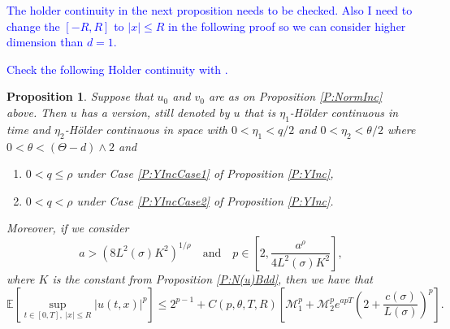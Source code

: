 \documentclass[a4paper,11pt]{article}
\numberwithin{equation}{section}
\theoremstyle{plain}
\newtheorem{proposition}[theorem]{Proposition}
\theoremstyle{definition}
\numberwithin{NQ}{section}
\numberwithin{LQ}{section}
\numberwithin{ZQ}{section}
\begin{document}
	\textcolor{blue}{The holder continuity in the next proposition needs to be checked. Also I need to change the $[-R,R]$ to $|x| \le R$ in the following proof so we can consider higher dimension than $d=1$.}
	
	\textcolor{blue}{Check the following Holder continuity with \cite{ChenHu21}.}
	
	\begin{proposition}
		\label{P:Holder}
		Suppose that $u_0$ and $v_0$ are as on Proposition \ref{P:NormInc} above. Then $u$ has a version, still denoted by $u$ that is $\eta_1$-H\"older continuous in time and $\eta_2$-H\"older continuous in space with $0 < \eta_1 < q/2$ and $0 < \eta_2 < \theta/2$ where $0 < \theta < (\Theta -d) \wedge 2$ and 
		\begin{enumerate}
			\item $0< q \le \rho$ under Case \ref{P:YIncCase1} of Proposition \ref{P:YInc},
			\item $0 < q < \rho$ under Case \ref{P:YIncCase2} of Proposition \ref{P:YInc}.
		\end{enumerate}
		Moreover, if we consider
		\[
		a > \left( 8 L^2(\sigma)K^2\right)^{1/\rho} \quad \text{and} \quad 	p \in \left[ 2, \frac{a^{\rho}}{4L^2(\sigma)K^2} \right],
		\]
		where $K$ is the constant from Proposition \ref{P:N(u)Bdd}, then we have that 
		\[
		\mathbb{E}\left[ \sup_{t\in[0,T],\; |x| \le R} |u(t,x)|^p \right] \le 2^{p-1} + C(p, \theta, T,R) \left[ \mathcal{M}_1^p + \mathcal{M}_2^p e^{apT} \left(2 +  \frac{c(\sigma)}{L(\sigma)}\right)^p\right].
		\]
	\end{proposition}
	
\end{document}
